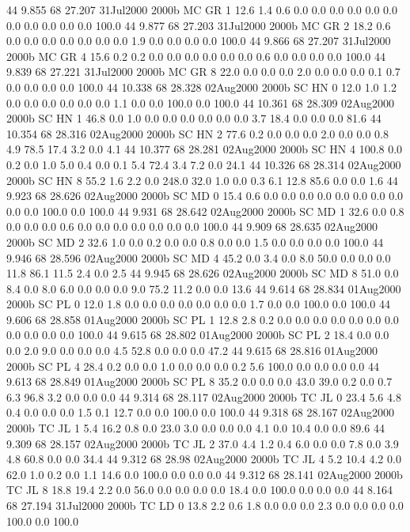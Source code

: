44 9.855	68 27.207	31Jul2000	2000b	MC	GR	1	12.6	1.4	0.6	0.0	0.0	0.0	0.0	0.0	0.0	0.0	0.0	0.0	0.0	0.0	100.0
44 9.877	68 27.203	31Jul2000	2000b	MC	GR	2	18.2	0.6	0.0	0.0	0.0	0.0	0.0	0.0	0.0	1.9	0.0	0.0	0.0	0.0	100.0
44 9.866	68 27.207	31Jul2000	2000b	MC	GR	4	15.6	0.2	0.2	0.0	0.0	0.0	0.0	0.0	0.0	0.6	0.0	0.0	0.0	0.0	100.0
44 9.839	68 27.221	31Jul2000	2000b	MC	GR	8	22.0	0.0	0.0	0.0	2.0	0.0	0.0	0.0	0.1	0.7	0.0	0.0	0.0	0.0	100.0
44 10.338	68 28.328	02Aug2000	2000b	SC	HN	0	12.0	1.0	1.2	0.0	0.0	0.0	0.0	0.0	0.0	1.1	0.0	0.0	100.0	0.0	100.0
44 10.361	68 28.309	02Aug2000	2000b	SC	HN	1	46.8	0.0	1.0	0.0	0.0	0.0	0.0	0.0	0.0	3.7	18.4	0.0	0.0	0.0	81.6
44 10.354	68 28.316	02Aug2000	2000b	SC	HN	2	77.6	0.2	0.0	0.0	0.0	2.0	0.0	0.0	0.8	4.9	78.5	17.4	3.2	0.0	4.1
44 10.377	68 28.281	02Aug2000	2000b	SC	HN	4	100.8	0.0	0.2	0.0	1.0	5.0	0.4	0.0	0.1	5.4	72.4	3.4	7.2	0.0	24.1
44 10.326	68 28.314	02Aug2000	2000b	SC	HN	8	55.2	1.6	2.2	0.0	248.0	32.0	1.0	0.0	0.3	6.1	12.8	85.6	0.0	0.0	1.6
44 9.923	68 28.626	02Aug2000	2000b	SC	MD	0	15.4	0.6	0.0	0.0	0.0	0.0	0.0	0.0	0.0	0.0	0.0	0.0	100.0	0.0	100.0
44 9.931	68 28.642	02Aug2000	2000b	SC	MD	1	32.6	0.0	0.8	0.0	0.0	0.0	0.6	0.0	0.0	0.0	0.0	0.0	0.0	0.0	100.0
44 9.909	68 28.635	02Aug2000	2000b	SC	MD	2	32.6	1.0	0.0	0.2	0.0	0.0	0.8	0.0	0.0	1.5	0.0	0.0	0.0	0.0	100.0
44 9.946	68 28.596	02Aug2000	2000b	SC	MD	4	45.2	0.0	3.4	0.0	8.0	50.0	0.0	0.0	0.0	11.8	86.1	11.5	2.4	0.0	2.5
44 9.945	68 28.626	02Aug2000	2000b	SC	MD	8	51.0	0.0	8.4	0.0	8.0	6.0	0.0	0.0	0.0	9.0	75.2	11.2	0.0	0.0	13.6
44 9.614	68 28.834	01Aug2000	2000b	SC	PL	0	12.0	1.8	0.0	0.0	0.0	0.0	0.0	0.0	0.0	1.7	0.0	0.0	100.0	0.0	100.0
44 9.606	68 28.858	01Aug2000	2000b	SC	PL	1	12.8	2.8	0.2	0.0	0.0	0.0	0.0	0.0	0.0	0.0	0.0	0.0	0.0	0.0	100.0
44 9.615	68 28.802	01Aug2000	2000b	SC	PL	2	18.4	0.0	0.0	0.0	2.0	9.0	0.0	0.0	0.0	4.5	52.8	0.0	0.0	0.0	47.2
44 9.615	68 28.816	01Aug2000	2000b	SC	PL	4	28.4	0.2	0.0	0.0	1.0	0.0	0.0	0.0	0.2	5.6	100.0	0.0	0.0	0.0	0.0
44 9.613	68 28.849	01Aug2000	2000b	SC	PL	8	35.2	0.0	0.0	0.0	43.0	39.0	0.2	0.0	0.7	6.3	96.8	3.2	0.0	0.0	0.0
44 9.314	68 28.117	02Aug2000	2000b	TC	JL	0	23.4	5.6	4.8	0.4	0.0	0.0	0.0	1.5	0.1	12.7	0.0	0.0	100.0	0.0	100.0
44 9.318	68 28.167	02Aug2000	2000b	TC	JL	1	5.4	16.2	0.8	0.0	23.0	3.0	0.0	0.0	0.0	4.1	0.0	10.4	0.0	0.0	89.6
44 9.309	68 28.157	02Aug2000	2000b	TC	JL	2	37.0	4.4	1.2	0.4	6.0	0.0	0.0	7.8	0.0	3.9	4.8	60.8	0.0	0.0	34.4
44 9.312	68 28.98	02Aug2000	2000b	TC	JL	4	5.2	10.4	4.2	0.0	62.0	1.0	0.2	0.0	1.1	14.6	0.0	100.0	0.0	0.0	0.0
44 9.312	68 28.141	02Aug2000	2000b	TC	JL	8	18.8	19.4	2.2	0.0	56.0	0.0	0.0	0.0	0.0	18.4	0.0	100.0	0.0	0.0	0.0
44 8.164	68 27.194	31Jul2000	2000b	TC	LD	0	13.8	2.2	0.6	1.8	0.0	0.0	0.0	2.3	0.0	0.0	0.0	0.0	100.0	0.0	100.0
